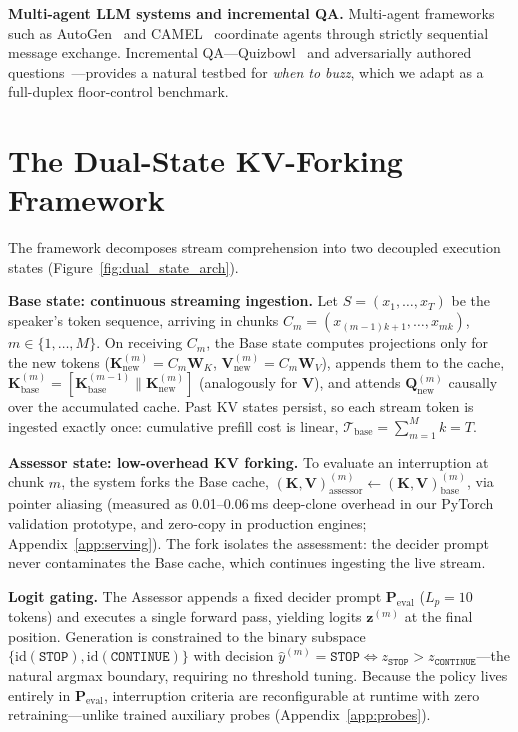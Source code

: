 \documentclass{article}
\begin{document}
\textbf{Multi-agent LLM systems and incremental QA.} Multi-agent frameworks such as AutoGen~\citep{wu2023autogen} and CAMEL~\citep{li2023camel} coordinate agents through strictly sequential message exchange. Incremental QA---Quizbowl~\citep{rodriguez2021quizbowl} and adversarially authored questions~\citep{wallace2019trick}---provides a natural testbed for \emph{when to buzz}, which we adapt as a full-duplex floor-control benchmark.

\section{The Dual-State KV-Forking Framework}
\label{sec:method}

The framework decomposes stream comprehension into two decoupled execution states (Figure~\ref{fig:dual_state_arch}).

\textbf{Base state: continuous streaming ingestion.} Let $S = (x_1, \dots, x_T)$ be the speaker's token sequence, arriving in chunks $C_m = (x_{(m-1)k+1}, \dots, x_{mk})$, $m \in \{1, \dots, M\}$. On receiving $C_m$, the Base state computes projections only for the new tokens ($\mathbf{K}_{\text{new}}^{(m)} = C_m \mathbf{W}_K$, $\mathbf{V}_{\text{new}}^{(m)} = C_m \mathbf{W}_V$), appends them to the cache, $\mathbf{K}_{\text{base}}^{(m)} = [ \mathbf{K}_{\text{base}}^{(m-1)} \| \mathbf{K}_{\text{new}}^{(m)} ]$ (analogously for $\mathbf{V}$), and attends $\mathbf{Q}_{\text{new}}^{(m)}$ causally over the accumulated cache. Past KV states persist, so each stream token is ingested exactly once: cumulative prefill cost is linear, $\mathcal{T}_{\text{base}} = \sum_{m=1}^{M} k = T$.

\textbf{Assessor state: low-overhead KV forking.} To evaluate an interruption at chunk $m$, the system forks the Base cache, $(\mathbf{K}, \mathbf{V})_{\text{assessor}}^{(m)} \leftarrow (\mathbf{K}, \mathbf{V})_{\text{base}}^{(m)}$, via pointer aliasing (measured as 0.01--0.06\,ms deep-clone overhead in our PyTorch validation prototype, and zero-copy in production engines; Appendix~\ref{app:serving}). The fork isolates the assessment: the decider prompt never contaminates the Base cache, which continues ingesting the live stream.

\textbf{Logit gating.} The Assessor appends a fixed decider prompt $\mathbf{P}_{\text{eval}}$ ($L_p = 10$ tokens) and executes a single forward pass, yielding logits $\mathbf{z}^{(m)}$ at the final position. Generation is constrained to the binary subspace $\{\text{id}(\texttt{STOP}), \text{id}(\texttt{CONTINUE})\}$ with decision $\hat{y}^{(m)} = \texttt{STOP} \iff z_{\texttt{STOP}} > z_{\texttt{CONTINUE}}$---the natural argmax boundary, requiring no threshold tuning. Because the policy lives entirely in $\mathbf{P}_{\text{eval}}$, interruption criteria are reconfigurable at runtime with zero retraining---unlike trained auxiliary probes (Appendix~\ref{app:probes}).
\end{document}
